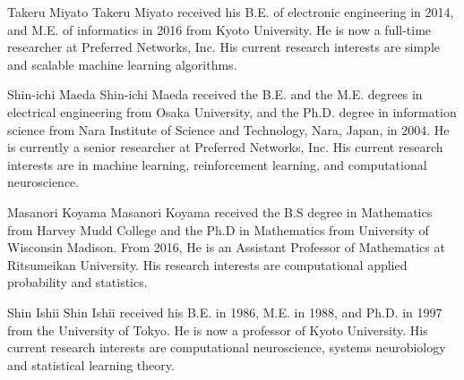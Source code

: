 \documentclass[10pt,journal,compsoc]{IEEEtran}
\begin{document}
\begin{IEEEbiography}{Takeru Miyato}
Takeru Miyato received his B.E. of electronic engineering in 2014, and M.E. of informatics in 2016 from Kyoto University.
He is now a full-time researcher at Preferred Networks, Inc.
His current research interests are simple and scalable machine learning algorithms.
\end{IEEEbiography}
\begin{IEEEbiography}
{Shin-ichi Maeda}
Shin-ichi Maeda received the B.E. and the M.E. degrees
in electrical engineering from Osaka University,  and
the Ph.D. degree in information science from Nara
Institute of Science and Technology, Nara, Japan, in
2004.
He is currently a senior researcher at Preferred Networks, Inc.
His current research interests are in machine learning,
reinforcement learning, and computational neuroscience.
\end{IEEEbiography}
\begin{IEEEbiography}
{Masanori Koyama}
Masanori Koyama received the B.S degree in Mathematics from Harvey Mudd College and the Ph.D in Mathematics from University of Wisconsin Madison.  From 2016, He is an Assistant Professor of Mathematics at Ritsumeikan University.  His research interests are computational applied probability and statistics.
\end{IEEEbiography}
\begin{IEEEbiography}
{Shin Ishii}
Shin Ishii received his B.E. in 1986, M.E. in 1988, and Ph.D. in 1997 from the University of Tokyo.
He is now a professor of Kyoto University. His current research interests are computational neuroscience, systems neurobiology and statistical learning theory.
\end{IEEEbiography}
\fi

\newpage
\onecolumn
\appendices
\end{document}

